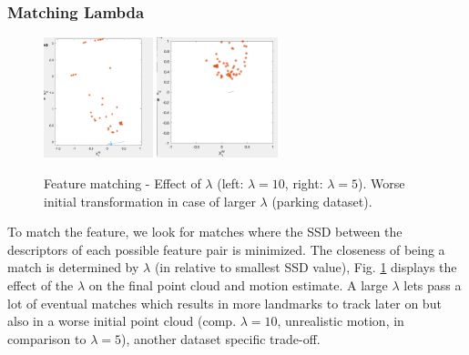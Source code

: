 \documentclass[letterpaper, 12 pt]{article}
\begin{document}
\begin{multicols*}{2}
\subsubsection{Matching Lambda}

\begin{figure}[H]
\begin{center}
\includegraphics[height=3.5cm]{matching_lambda_bad.png}
\includegraphics[height=3.5cm]{matching_lambda_good.png}
\end{center}
\caption{Feature matching - Effect of $\lambda$ (left: $\lambda = 10$, right: $\lambda = 5$). Worse initial transformation in case of larger $\lambda$ (parking dataset).}
\label{fig:matching_lambda}
\end{figure}

To match the feature, we look for matches where the SSD between the descriptors of each possible feature pair is minimized. The closeness of being a match is determined by $\lambda$ (in relative to smallest SSD value), Fig. \ref{fig:matching_lambda} displays the effect of the $\lambda$ on the final point cloud and motion estimate. A large $\lambda$ lets pass a lot of eventual matches which results in more landmarks to track later on but also in a worse initial point cloud (comp. $\lambda = 10$, unrealistic motion, in comparison to $\lambda = 5$), another dataset specific trade-off.


\end{multicols*}
\end{document}
